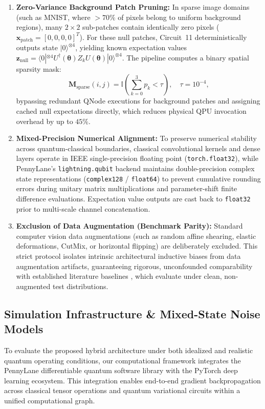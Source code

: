 \documentclass[journal]{IEEEtran}
\begin{document}
\begin{enumerate}
    \item \textbf{Zero-Variance Background Patch Pruning:} In sparse image domains (such as MNIST, where ${>}70\%$ of pixels belong to uniform background regions), many $2 \times 2$ sub-patches contain identically zero pixels ($\mathbf{x}_{\mathrm{patch}} = [0,0,0,0]^T$). For these null patches, Circuit~11 deterministically outputs state $|0\rangle^{\otimes 4}$, yielding known expectation values $\mathbf{z}_{\mathrm{null}} = \langle 0|^{\otimes 4} U^\dagger(\boldsymbol{\theta}) Z_k U(\boldsymbol{\theta}) |0\rangle^{\otimes 4}$. The pipeline computes a binary spatial sparsity mask:
    \begin{equation}
    \mathbf{M}_{\mathrm{sparse}}(i, j) = \mathbb{I}\left( \sum_{k=0}^3 p_k < \tau \right), \quad \tau = 10^{-4},
    \label{eq:sparsity_mask}
    \end{equation}
    bypassing redundant QNode executions for background patches and assigning cached null expectations directly, which reduces physical QPU invocation overhead by up to $45\%$.
    
    \item \textbf{Mixed-Precision Numerical Alignment:} To preserve numerical stability across quantum-classical boundaries, classical convolutional kernels and dense layers operate in IEEE single-precision floating point (\texttt{torch.float32}), while PennyLane's \texttt{lightning.qubit} backend maintains double-precision complex state representations (\texttt{complex128} / \texttt{float64}) to prevent cumulative rounding errors during unitary matrix multiplications and parameter-shift finite difference evaluations. Expectation value outputs are cast back to \texttt{float32} prior to multi-scale channel concatenation.
    
    \item \textbf{Exclusion of Data Augmentation (Benchmark Parity):} Standard computer vision data augmentations (such as random affine shearing, elastic deformations, CutMix, or horizontal flipping) are deliberately excluded. This strict protocol isolates intrinsic architectural inductive biases from data augmentation artifacts, guaranteeing rigorous, unconfounded comparability with established literature baselines \cite{henderson2020quanvolutional, senokosov2024quantum, liu2026parallel}, which evaluate under clean, non-augmented test distributions.
\end{enumerate}

\subsection{Simulation Infrastructure \& Mixed-State Noise Models}
\label{subsec:simulation_infrastructure}
To evaluate the proposed hybrid architecture under both idealized and realistic quantum operating conditions, our computational framework integrates the PennyLane differentiable quantum software library \cite{bergholm2018pennylane} with the PyTorch deep learning ecosystem. This integration enables end-to-end gradient backpropagation across classical tensor operations and quantum variational circuits within a unified computational graph.
\end{document}
